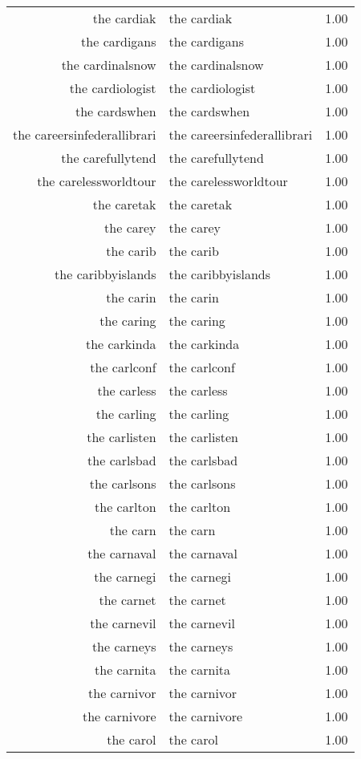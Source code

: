 \begin{table}[ht]
\begin{tabular}{rlr}
  the cardiak & the cardiak & 1.00 \\ 
  the cardigans & the cardigans & 1.00 \\ 
  the cardinalsnow & the cardinalsnow & 1.00 \\ 
  the cardiologist & the cardiologist & 1.00 \\ 
  the cardswhen & the cardswhen & 1.00 \\ 
  the careersinfederallibrari & the careersinfederallibrari & 1.00 \\ 
  the carefullytend & the carefullytend & 1.00 \\ 
  the carelessworldtour & the carelessworldtour & 1.00 \\ 
  the caretak & the caretak & 1.00 \\ 
  the carey & the carey & 1.00 \\ 
  the carib & the carib & 1.00 \\ 
  the caribbyislands & the caribbyislands & 1.00 \\ 
  the carin & the carin & 1.00 \\ 
  the caring & the caring & 1.00 \\ 
  the carkinda & the carkinda & 1.00 \\ 
  the carlconf & the carlconf & 1.00 \\ 
  the carless & the carless & 1.00 \\ 
  the carling & the carling & 1.00 \\ 
  the carlisten & the carlisten & 1.00 \\ 
  the carlsbad & the carlsbad & 1.00 \\ 
  the carlsons & the carlsons & 1.00 \\ 
  the carlton & the carlton & 1.00 \\ 
  the carn & the carn & 1.00 \\ 
  the carnaval & the carnaval & 1.00 \\ 
  the carnegi & the carnegi & 1.00 \\ 
  the carnet & the carnet & 1.00 \\ 
  the carnevil & the carnevil & 1.00 \\ 
  the carneys & the carneys & 1.00 \\ 
  the carnita & the carnita & 1.00 \\ 
  the carnivor & the carnivor & 1.00 \\ 
  the carnivore & the carnivore & 1.00 \\ 
  the carol & the carol & 1.00 \\ 

\end{tabular}
\end{table}
